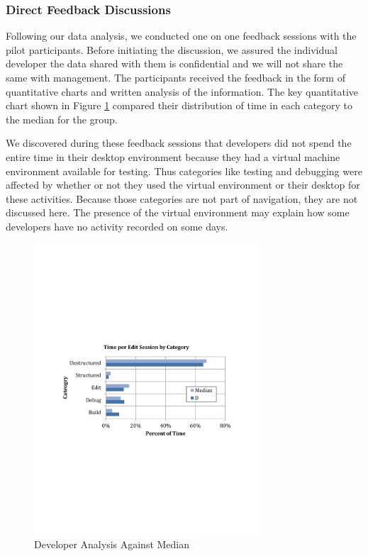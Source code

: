 \documentclass{sig-alternate}
\begin{document}
\subsubsection{Direct Feedback Discussions}


Following our data analysis, we conducted one on one feedback sessions with the pilot participants. Before initiating the discussion, we assured the individual developer the data shared with them is confidential and we will not share the same with management. The participants received the feedback in the form of quantitative charts and written analysis of the information.  The key quantitative chart shown in Figure \ref{fig:developercomparison} compared their distribution of time in each category to the median for the group.   

We discovered during these feedback sessions that developers did not spend the entire time in their desktop environment because they had a virtual machine environment available for testing. Thus categories like testing and debugging were affected by whether or not they used the virtual environment or their desktop for these activities.  Because those categories are not part of navigation, they are not discussed here. The presence of the virtual environment may explain how some developers have no activity recorded on some days.  

\begin{figure}
	\includegraphics[width=3.3in]{developerEmedian.pdf}
	\caption{Developer Analysis Against Median}
	\label{fig:developercomparison}
\end{figure}
\end{document}
